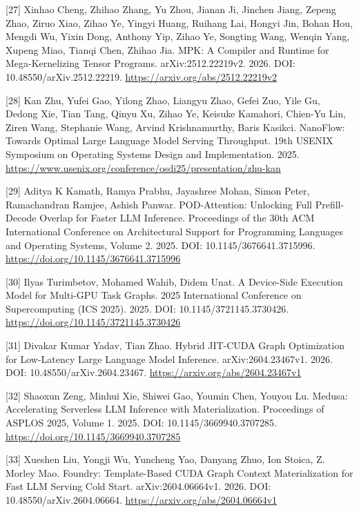 \documentclass[UTF8,11pt,fontset=windows]{ctexart}
\begin{document}
\leavevmode{}%
{[}27{]} Xinhao Cheng, Zhihao Zhang, Yu Zhou, Jianan Ji, Jinchen Jiang, Zepeng Zhao, Ziruo Xiao, Zihao Ye, Yingyi Huang, Ruihang Lai, Hongyi Jin, Bohan Hou, Mengdi Wu, Yixin Dong, Anthony Yip, Zihao Ye, Songting Wang, Wenqin Yang, Xupeng Miao, Tianqi Chen, Zhihao Jia. MPK: A Compiler and Runtime for Mega-Kernelizing Tensor Programs. arXiv:2512.22219v2. 2026. DOI: 10.48550/arXiv.2512.22219. \url{https://arxiv.org/abs/2512.22219v2}

\leavevmode{}%
{[}28{]} Kan Zhu, Yufei Gao, Yilong Zhao, Liangyu Zhao, Gefei Zuo, Yile Gu, Dedong Xie, Tian Tang, Qinyu Xu, Zihao Ye, Keisuke Kamahori, Chien-Yu Lin, Ziren Wang, Stephanie Wang, Arvind Krishnamurthy, Baris Kasikci. NanoFlow: Towards Optimal Large Language Model Serving Throughput. 19th USENIX Symposium on Operating Systems Design and Implementation. 2025. \url{https://www.usenix.org/conference/osdi25/presentation/zhu-kan}

\leavevmode{}%
{[}29{]} Aditya K Kamath, Ramya Prabhu, Jayashree Mohan, Simon Peter, Ramachandran Ramjee, Ashish Panwar. POD-Attention: Unlocking Full Prefill-Decode Overlap for Faster LLM Inference. Proceedings of the 30th ACM International Conference on Architectural Support for Programming Languages and Operating Systems, Volume 2. 2025. DOI: 10.1145/3676641.3715996. \url{https://doi.org/10.1145/3676641.3715996}

\leavevmode{}%
{[}30{]} Ilyas Turimbetov, Mohamed Wahib, Didem Unat. A Device-Side Execution Model for Multi-GPU Task Graphs. 2025 International Conference on Supercomputing (ICS 2025). 2025. DOI: 10.1145/3721145.3730426. \url{https://doi.org/10.1145/3721145.3730426}

\leavevmode{}%
{[}31{]} Divakar Kumar Yadav, Tian Zhao. Hybrid JIT-CUDA Graph Optimization for Low-Latency Large Language Model Inference. arXiv:2604.23467v1. 2026. DOI: 10.48550/arXiv.2604.23467. \url{https://arxiv.org/abs/2604.23467v1}

\leavevmode{}%
{[}32{]} Shaoxun Zeng, Minhui Xie, Shiwei Gao, Youmin Chen, Youyou Lu. Medusa: Accelerating Serverless LLM Inference with Materialization. Proceedings of ASPLOS 2025, Volume 1. 2025. DOI: 10.1145/3669940.3707285. \url{https://doi.org/10.1145/3669940.3707285}

\leavevmode{}%
{[}33{]} Xueshen Liu, Yongji Wu, Yuncheng Yao, Danyang Zhuo, Ion Stoica, Z. Morley Mao. Foundry: Template-Based CUDA Graph Context Materialization for Fast LLM Serving Cold Start. arXiv:2604.06664v1. 2026. DOI: 10.48550/arXiv.2604.06664. \url{https://arxiv.org/abs/2604.06664v1}
\end{document}
